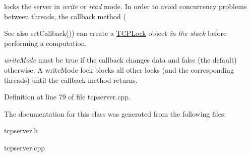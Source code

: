 locks the server in {\itshape write} or {\itshape read} mode. In order to avoid concurrency problems between threads, the callback method ( 

\begin{DoxySeeAlso}{See also}
set\+Callback()) can create a \mbox{\hyperlink{classcppu_1_1_t_c_p_lock}{T\+C\+P\+Lock}} object {\itshape in the stack} before performing a computation.
\end{DoxySeeAlso}
{\itshape write\+Mode} must be true if the callback changes data and false (the default) otherwise. A write\+Mode lock blocks all other locks (and the corresponding threads) until the callback method returns. 

Definition at line 79 of file tcpserver.\+cpp.


\begin{DoxyCode}{0}

\end{DoxyCode}


The documentation for this class was generated from the following files\+:\begin{DoxyCompactItemize}
\item 
tcpserver.\+h\item 
tcpserver.\+cpp\end{DoxyCompactItemize}
